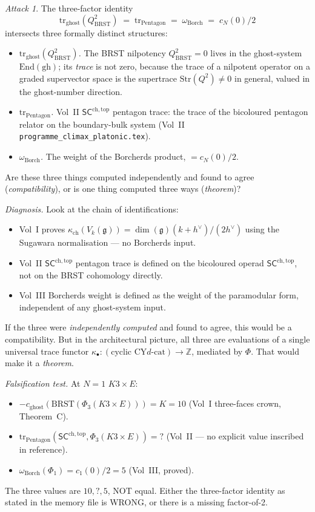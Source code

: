 \documentclass[11pt]{amsart}
\theoremstyle{definition}
\theoremstyle{remark}
\newtheorem{attack}[theorem]{Attack}
\newcommand{\kch}{\kappa_{\mathrm{ch}}}
\newcommand{\Borch}{\mathrm{Borch}}
\newcommand{\BRST}{\mathrm{BRST}}
\begin{document}
\begin{attack}
The three-factor identity
\[
\mathrm{tr}_{\mathrm{ghost}}(Q_{\BRST}^2) \;=\; \mathrm{tr}_{\mathrm{Pentagon}} \;=\; \omega_{\Borch} \;=\; c_N(0)/2
\]
intersects three formally distinct structures:
\begin{itemize}
\item \emph{$\mathrm{tr}_{\mathrm{ghost}}(Q_{\BRST}^2)$.} The BRST nilpotency $Q_{\BRST}^2 = 0$
lives in the ghost-system $\mathrm{End}(\mathrm{gh})$; its \emph{trace} is not zero, because the
trace of a nilpotent operator on a graded supervector space is the supertrace
$\mathrm{Str}(Q^2) \neq 0$ in general, valued in the ghost-number direction.
\item \emph{$\mathrm{tr}_{\mathrm{Pentagon}}$.} Vol~II $\mathsf{SC}^{\mathrm{ch,top}}$ pentagon
trace: the trace of the bicoloured pentagon relator on the boundary-bulk system
(Vol~II \texttt{programme\_climax\_platonic.tex}).
\item \emph{$\omega_{\Borch}$.} The weight of the Borcherds product, $= c_N(0)/2$.
\end{itemize}

Are these three things computed independently and found to agree (\emph{compatibility}), or is
one thing computed three ways (\emph{theorem})?

\emph{Diagnosis.} Look at the chain of identifications:
\begin{itemize}
\item Vol~I proves $\kch(V_k(\mathfrak{g})) = \dim(\mathfrak{g})(k+h^\vee)/(2h^\vee)$ using the
Sugawara normalisation --- no Borcherds input.
\item Vol~II $\mathsf{SC}^{\mathrm{ch,top}}$ pentagon trace is defined on the bicoloured operad
$\mathsf{SC}^{\mathrm{ch,top}}$, not on the BRST cohomology directly.
\item Vol~III Borcherds weight is defined as the weight of the paramodular form, independent of
any ghost-system input.
\end{itemize}

If the three were \emph{independently computed} and found to agree, this would be a compatibility.
But in the architectural picture, all three are evaluations of a single universal trace functor
$\kappa_\bullet: (\text{cyclic CY} d\text{-cat}) \to \mathbb{Z}$, mediated by $\Phi$. That would
make it a \emph{theorem}.

\emph{Falsification test.} At $N = 1$ $K3 \times E$:
\begin{itemize}
\item $-c_{\mathrm{ghost}}(\BRST(\Phi_3(K3 \times E))) = K = 10$ (Vol~I three-faces crown, Theorem~C).
\item $\mathrm{tr}_{\mathrm{Pentagon}}(\mathsf{SC}^{\mathrm{ch,top}}, \Phi_3(K3 \times E)) = ?$ (Vol~II --- no
explicit value inscribed in reference).
\item $\omega_{\Borch}(\Phi_1) = c_1(0)/2 = 5$ (Vol~III, proved).
\end{itemize}

The three values are $10, ?, 5$, NOT equal. Either the three-factor identity as stated in the
memory file is WRONG, or there is a missing factor-of-2.
\end{attack}
\end{document}
